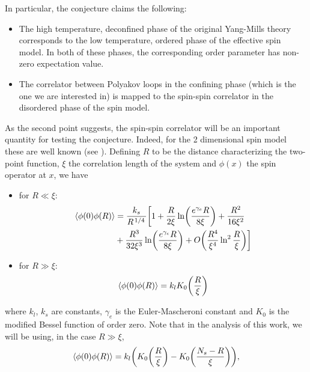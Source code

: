 \documentclass[reqno,12pt]{article}
\numberwithin{equation}{section}
\begin{document}
In particular, the conjecture claims the following:
\begin{itemize}
	\item The high temperature, deconfined phase of the original Yang-Mills theory corresponds to the low temperature, ordered phase of 
	the effective spin model. In both of these phases, the corresponding order parameter has non-zero expectation value.

	\item The correlator between Polyakov loops in the confining phase (which is the one we are interested in) is mapped to the spin-spin
	correlator in the disordered phase of the spin model. 
\end{itemize}

As the second point suggests, the spin-spin correlator will be an important quantity for testing the conjecture. Indeed, for the 2 dimensional
spin model these are well known (see \cite{caristo}). Defining $R$ to be the distance characterizing the two-point function, $\xi$ the
correlation length of the system and $\phi(x)$ the spin operator at $x$, we have
\begin{itemize}
	\item for $R \ll \xi$:
		\begin{equation} \label{eq:short_distance_spin}
			\begin{aligned}
				\expval{\phi(0) \phi(R)} &= \frac{k_s}{R^{\flatfrac{1}{4}}} \biggl[ 1 + \frac{R}{2\xi} \ln(\frac{e^{\gamma_e}R}{8\xi}) + \frac{R^2}{16\xi^2} \\
				&+ \frac{R^3}{32\xi^3} \ln(\frac{e^{\gamma_e}R}{8\xi}) + O\qty(\frac{R^4}{\xi^4}\ln^2\frac{R}{\xi}) \biggr]
			\end{aligned}
		\end{equation}

	\item for $R \gg \xi$:
		\begin{equation} 
			\expval{\phi(0) \phi(R)} = k_l K_0\qty(\frac{R}{\xi})
		\end{equation}
\end{itemize}

where $k_l$, $k_s$ are constants, $\gamma_e$ is the Euler-Mascheroni constant and $K_0$ is the modified Bessel function of order zero. 
Note that in the analysis of this work, we will be using, in the case $R \gg \xi$,
\begin{equation} \label{eq:large_distance_spin}
	\expval{\phi(0) \phi(R)} = k_l \qty(K_0\qty(\frac{R}{\xi}) - K_0\qty(\frac{N_s - R}{\xi})),
\end{equation}
\end{document}
